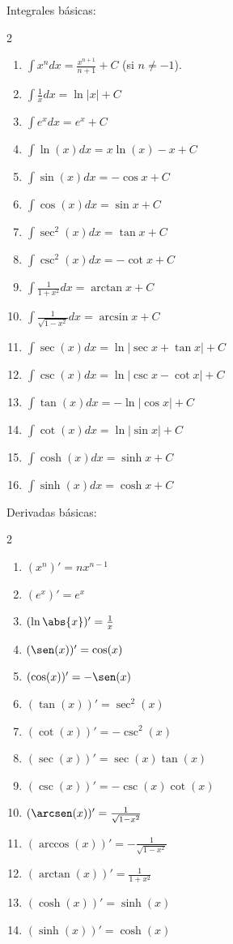 \documentclass{article}
\begin{document}
{\large Integrales básicas:}
\begin{multicols}{2}
  \begin{enumerate}
    \item $\displaystyle\int x^n dx = \frac{x^{n+1}}{n+1}+C$ (si $n\neq -1$).
    \item $\displaystyle\int \frac{1}{x}dx = \ln|x|+C$
    \item $\displaystyle\int e^x dx = e^x+C$
    \item $\displaystyle\int \ln(x) dx = x\ln(x)-x+C$
    \item $\displaystyle\int \sin(x) dx = -\cos x+C$
    \item $\displaystyle\int \cos(x) dx = \sin x+C$
    \item $\displaystyle\int \sec^2(x) dx = \tan x+C$
    \item $\displaystyle\int \csc^2(x) dx = -\cot x+C$
    \item $\displaystyle\int \frac{1}{1+x^2}dx = \arctan x+C$
    \item $\displaystyle\int \frac{1}{\sqrt{1-x^2}}dx = \arcsin x+C$
    \item $\displaystyle\int \sec(x) dx = \ln|\sec x+\tan x|+C$
    \item $\displaystyle\int \csc(x) dx = \ln|\csc x-\cot x|+C$
    \item $\displaystyle\int \tan(x) dx = -\ln|\cos x|+C$
    \item $\displaystyle\int \cot(x) dx = \ln|\sin x|+C$
    \item $\displaystyle\int \cosh(x) dx = \sinh x+C$
    \item $\displaystyle\int \sinh(x) dx = \cosh x+C$
  \end{enumerate}
\end{multicols}
\vspace{2mm}

{\large Derivadas básicas:}
\begin{multicols}{2}
  \begin{enumerate}
    \item $(x^n)' = nx^{n-1}$
    \item $(e^x)' = e^x$
    \item $(\ln\abs{x})' = \frac{1}{x}$
    \item $(\sen(x))' = \cos(x)$
    \item $(\cos(x))' = -\sen(x)$
    \item $(\tan(x))' = \sec^2(x)$
    \item $(\cot(x))' = -\csc^2(x)$
    \item $(\sec(x))' = \sec(x)\tan(x)$
    \item $(\csc(x))' = -\csc(x)\cot(x)$
    \item $(\arcsen(x))' = \frac{1}{\sqrt{1-x^2}}$
    \item $(\arccos(x))' = -\frac{1}{\sqrt{1-x^2}}$
    \item $(\arctan(x))' = \frac{1}{1+x^2}$
    \item $(\cosh(x))' = \sinh(x)$
    \item $(\sinh(x))' = \cosh(x)$
  \end{enumerate}
\end{multicols}
\vspace{2mm}
\end{document}
